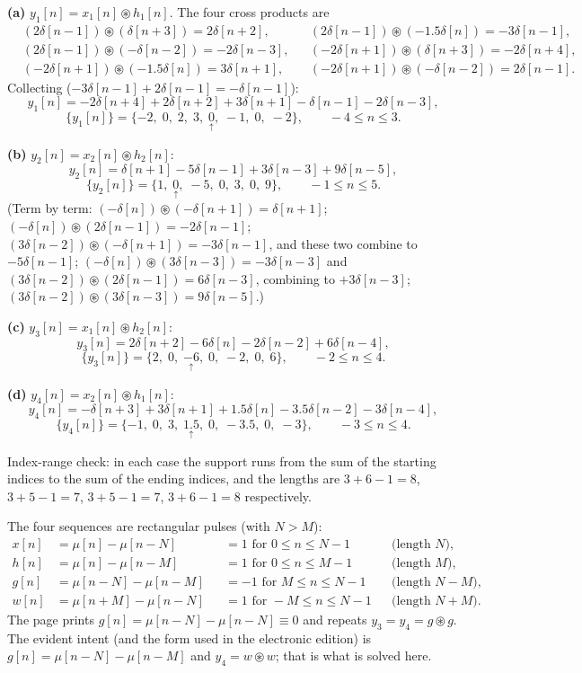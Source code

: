 \textbf{(a)} $y_1[n]=x_1[n]\circledast h_1[n]$. The four cross products are
\[
\begin{aligned}
&(2\delta[n-1])\circledast(\delta[n+3])=2\delta[n+2], &&(2\delta[n-1])\circledast(-1.5\delta[n])=-3\delta[n-1],\\
&(2\delta[n-1])\circledast(-\delta[n-2])=-2\delta[n-3], &&(-2\delta[n+1])\circledast(\delta[n+3])=-2\delta[n+4],\\
&(-2\delta[n+1])\circledast(-1.5\delta[n])=3\delta[n+1], &&(-2\delta[n+1])\circledast(-\delta[n-2])=2\delta[n-1].
\end{aligned}
\]
Collecting ($-3\delta[n-1]+2\delta[n-1]=-\delta[n-1]$):
\[
\boxed{\;y_1[n]=-2\delta[n+4]+2\delta[n+2]+3\delta[n+1]-\delta[n-1]-2\delta[n-3],\;}
\]
\[
\{y_1[n]\}=\{-2,\;0,\;2,\;3,\;\underset{\uparrow}{0},\;-1,\;0,\;-2\},\qquad -4\le n\le 3 .
\]

\textbf{(b)} $y_2[n]=x_2[n]\circledast h_2[n]$:
\[
\boxed{\;y_2[n]=\delta[n+1]-5\delta[n-1]+3\delta[n-3]+9\delta[n-5],\;}
\]
\[
\{y_2[n]\}=\{1,\;\underset{\uparrow}{0},\;-5,\;0,\;3,\;0,\;9\},\qquad -1\le n\le 5 .
\]
(Term by term: $(-\delta[n])\circledast(-\delta[n+1])=\delta[n+1]$;
$(-\delta[n])\circledast(2\delta[n-1])=-2\delta[n-1]$;
$(3\delta[n-2])\circledast(-\delta[n+1])=-3\delta[n-1]$, and these two combine to $-5\delta[n-1]$;
$(-\delta[n])\circledast(3\delta[n-3])=-3\delta[n-3]$ and
$(3\delta[n-2])\circledast(2\delta[n-1])=6\delta[n-3]$, combining to $+3\delta[n-3]$;
$(3\delta[n-2])\circledast(3\delta[n-3])=9\delta[n-5]$.)

\textbf{(c)} $y_3[n]=x_1[n]\circledast h_2[n]$:
\[
\boxed{\;y_3[n]=2\delta[n+2]-6\delta[n]-2\delta[n-2]+6\delta[n-4],\;}
\]
\[
\{y_3[n]\}=\{2,\;0,\;\underset{\uparrow}{-6},\;0,\;-2,\;0,\;6\},\qquad -2\le n\le 4 .
\]

\textbf{(d)} $y_4[n]=x_2[n]\circledast h_1[n]$:
\[
\boxed{\;y_4[n]=-\delta[n+3]+3\delta[n+1]+1.5\delta[n]-3.5\delta[n-2]-3\delta[n-4],\;}
\]
\[
\{y_4[n]\}=\{-1,\;0,\;3,\;\underset{\uparrow}{1.5},\;0,\;-3.5,\;0,\;-3\},\qquad -3\le n\le 4 .
\]

Index-range check: in each case the support runs from the sum of the starting indices to the
sum of the ending indices, and the lengths are $3+6-1=8$, $3+5-1=7$, $3+5-1=7$, $3+6-1=8$
respectively. \checkmark


The four sequences are rectangular pulses (with $N>M$):
\[
\begin{aligned}
x[n]&=\mu[n]-\mu[n-N] &&=1 \text{ for } 0\le n\le N-1 &&\text{(length }N),\\
h[n]&=\mu[n]-\mu[n-M] &&=1 \text{ for } 0\le n\le M-1 &&\text{(length }M),\\
g[n]&=\mu[n-N]-\mu[n-M] &&=-1 \text{ for } M\le n\le N-1 &&\text{(length }N-M),\\
w[n]&=\mu[n+M]-\mu[n-N] &&=1 \text{ for } -M\le n\le N-1 &&\text{(length }N+M).
\end{aligned}
\]
\Mis The page prints $g[n]=\mu[n-N]-\mu[n-N]\equiv0$ and repeats
$y_3=y_4=g\circledast g$. The evident intent (and the form used in the electronic edition) is
$g[n]=\mu[n-N]-\mu[n-M]$ and $y_4=w\circledast w$; that is what is solved here.

